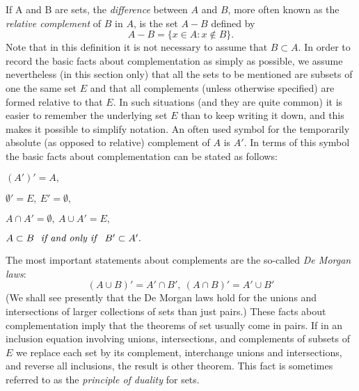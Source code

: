 
If A and B are sets, the \textit{difference} between $A$ and $B$, more often known as the \textit{relative complement} of $B$ in $A$, is the set $A - B$ defined by 
\begin{equation*}
A - B = \{ x \in A: x \notin B \}.
\end{equation*}
Note that in this definition it is not necessary to assume that $B \subset A$. In order to record the basic facts about complementation as simply as possible, we assume nevertheless (in this section only) that all the sets to be mentioned are subsets of one the same set $E$ and that all complements (unless otherwise specified) are formed relative to that $E$. In such situations (and they are quite common) it is easier to remember the underlying set $E$ than to keep writing it down, and this makes it possible to simplify notation. An often used symbol for the temporarily absolute (as opposed to relative) complement of $A$ is $A'$. In terms of this symbol the basic facts about complementation can be stated as follows:
\begin{center}
$(A')' = A,$

$\emptyset ' = E, \: E' = \emptyset ,$

$ A \cap A' = \emptyset, \: A \cup A' = E,$

$A \subset B \text{ \textit{ if and only if } } B' \subset A'.$
\end{center}
The most important statements about complements are the so-called \textit{De Morgan laws}:
\begin{equation*}
(A \cup B)' = A' \cap B', \: (A \cap B)' = A' \cup B'
\end{equation*}
(We shall see presently that the De Morgan laws hold for the unions and intersections of larger collections of sets than just pairs.) These facts about complementation imply that the theorems of set usually come in pairs. If in an inclusion equation involving unions, intersections, and complements of subsets of $E$ we replace each set by its complement, interchange unions and intersections, and reverse all  inclusions, the result is other theorem. This fact is sometimes referred to as the \textit{principle of duality} for sets.

